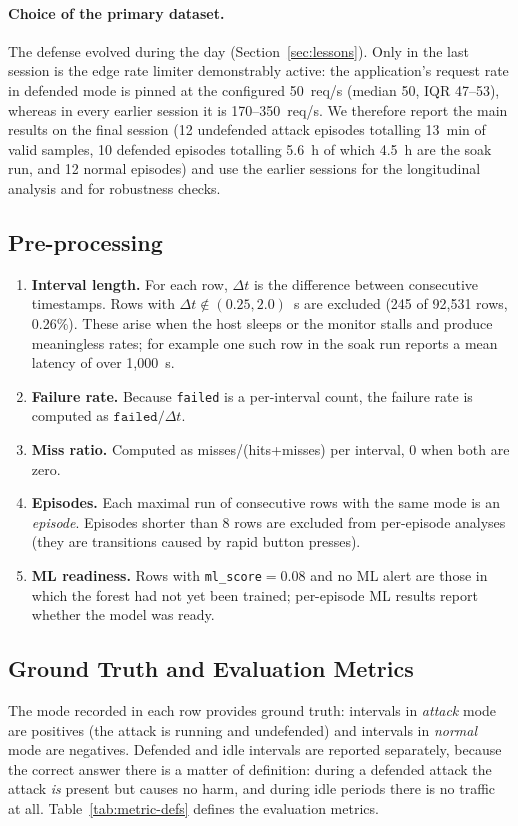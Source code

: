 \paragraph{Choice of the primary dataset.} The defense evolved during the day
(Section~\ref{sec:lessons}). Only in the last session is the edge rate limiter
demonstrably active: the application's request rate in defended mode is pinned at the
configured 50~req/s (median 50, IQR 47--53), whereas in every earlier session it is
170--350~req/s. We therefore report the main results on the final session (12
undefended attack episodes totalling 13~min of valid samples, 10 defended episodes
totalling 5.6~h of which 4.5~h are the soak run, and 12 normal episodes) and use the earlier sessions for the longitudinal
analysis and for robustness checks.

\subsection{Pre-processing}
\begin{enumerate}[leftmargin=*]
\item \textbf{Interval length.} For each row, $\Delta t$ is the difference between
consecutive timestamps. Rows with $\Delta t\notin(0.25, 2.0)$~s are excluded (245 of
92{,}531 rows, 0.26\%). These arise when the host sleeps or the monitor stalls and produce
meaningless rates; for example one such row in the soak run reports a mean latency of
over 1{,}000~s.
\item \textbf{Failure rate.} Because \texttt{failed} is a per-interval count, the
failure rate is computed as $\texttt{failed}/\Delta t$.
\item \textbf{Miss ratio.} Computed as misses/(hits+misses) per interval, 0 when both
are zero.
\item \textbf{Episodes.} Each maximal run of consecutive rows with the same mode is an
\emph{episode}. Episodes shorter than 8 rows are excluded from per-episode analyses
(they are transitions caused by rapid button presses).
\item \textbf{ML readiness.} Rows with \texttt{ml\_score}$=0.08$ and no ML alert are
those in which the forest had not yet been trained; per-episode ML results report
whether the model was ready.
\end{enumerate}

\subsection{Ground Truth and Evaluation Metrics}
The mode recorded in each row provides ground truth: intervals in \emph{attack} mode
are positives (the attack is running and undefended) and intervals in \emph{normal}
mode are negatives. Defended and idle intervals are reported separately, because the
correct answer there is a matter of definition: during a defended attack the attack
\emph{is} present but causes no harm, and during idle periods there is no traffic at
all. Table~\ref{tab:metric-defs} defines the evaluation metrics.

